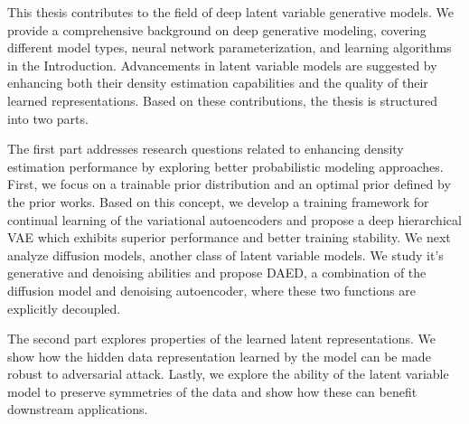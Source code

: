 \begin{abstractpage}

This thesis contributes to the field of deep latent variable generative models.
We provide a comprehensive background on deep generative modeling, covering different model types, neural network parameterization, and learning algorithms in the Introduction. 
Advancements in latent variable models are suggested by enhancing both their density estimation capabilities and the quality of their learned representations.
Based on these contributions, the thesis is structured into two parts. 

The first part addresses research questions related to enhancing density estimation performance by exploring better probabilistic modeling approaches. 
First, we focus on a trainable prior distribution and an optimal prior defined by the prior works. Based on this concept, we develop a training framework for continual learning of the variational autoencoders and propose a deep hierarchical VAE which exhibits superior performance and better training stability. We next analyze diffusion models, another class of latent variable models. We study it's generative and denoising abilities and propose DAED, a combination of the diffusion model and denoising autoencoder, where these two functions are explicitly decoupled. 

The second part explores properties of the learned latent representations. We show how the hidden data representation learned by the model can be made robust to adversarial attack. Lastly, we explore the ability of the latent variable model to preserve symmetries of the data and show how these can benefit downstream applications.




\end{abstractpage}
